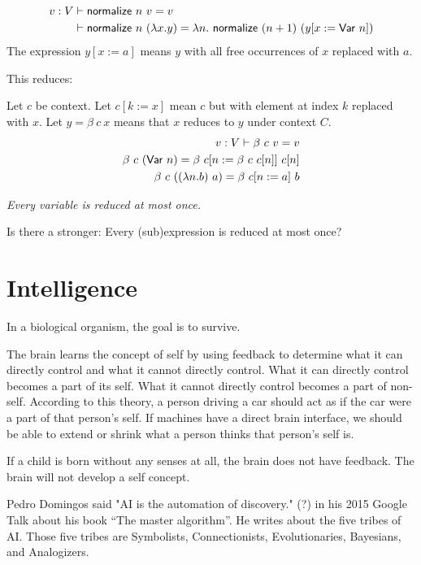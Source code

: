 \begin{align*}
    v : V &\vdash \textsf{normalize}~n~v = v
    \\
    &\vdash \textsf{normalize}~n~(\lambda x.y) = \lambda n. ~ \textsf{normalize}~(n+1)~(y[x := \textsf{Var}~n])
\end{align*}
The expression \(y[x := a]\) means \(y\)
with all free occurrences of \(x\) replaced with \(a\).

This reduces:

Let \(c\) be context.
Let \(c[k := x]\) mean \(c\) but with element at index \(k\) replaced with \(x\).
Let \(y = \beta~c~x\) means that \(x\) reduces to \(y\) under context \(C\).
\begin{align*}
    v : V \vdash \beta~c~v = v
    \\
    \beta~c~(\textsf{Var}~n) = \beta~c[n := \beta~c~c[n]]~c[n]
    \\
    \beta~c~((\lambda n. b)~a) = \beta~c[n := a]~b
\end{align*}

\emph{Every variable is reduced at most once.}

Is there a stronger: Every (sub)expression is reduced at most once?

\section{Intelligence}

In a biological organism, the goal is to survive.

The brain learns the concept of self by using feedback
to determine what it can directly control
and what it cannot directly control.
What it can directly control becomes a part of its self.
What it cannot directly control becomes a part of non-self.
According to this theory, a person driving a car
should act as if the car were a part of that person's self.
If machines have a direct brain interface,
we should be able to extend or shrink what a person thinks that person's self is.

If a child is born without any senses at all,
the brain does not have feedback.
The brain will not develop a self concept.

Pedro Domingos said
"AI is the automation of discovery." (?)
in his 2015 Google Talk about his book ``The master algorithm''.
He writes about the five tribes of AI.
Those five tribes are Symbolists, Connectionists, Evolutionaries, Bayesians, and Analogizers.


